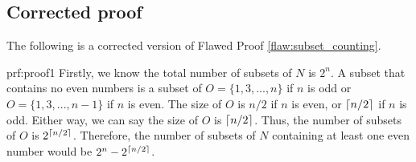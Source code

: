 \clearpage
\subsection{Corrected proof}

The following is a corrected version of Flawed Proof \ref{flaw:subset_counting}. %

\begin{prf}{prf:proof1} %
Firstly, we know the total number of subsets of $N$ is $2^n$. A subset that contains no even numbers is a subset of $O = \{1,3,...,n\}$ if $n$ is odd or $O = \{1,3,...,n-1\}$ if $n$ is even. The size of $O$ is $n/2$ if $n$ is even, or $\lceil n/2\rceil$ if $n$ is odd. Either way, we can say the size of $O$ is $\lceil n/2\rceil$. Thus, the number of subsets of $O$ is $2^{\lceil n/2\rceil}$. Therefore, the number of subsets of $N$ containing at least one even number would be $2^n - 2^{\lceil n/2\rceil}$. 
\end{prf}